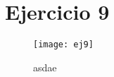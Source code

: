 \section{Ejercicio 9}

\begin{figure}[H]
		\centering
		\texttt{[image: ej9]}
		\caption{asdae}
		\label{fig:ej9}
\end{figure}

